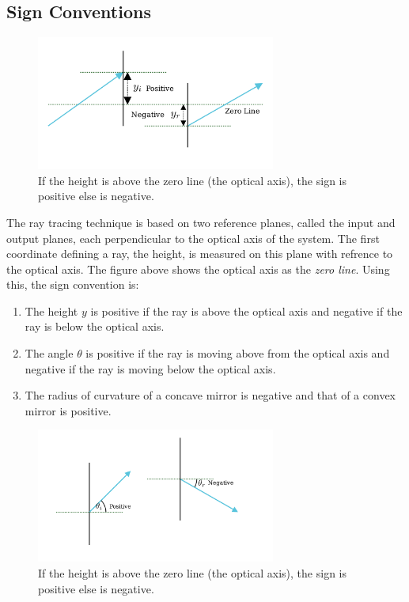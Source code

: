 \documentclass[12pt]{article}
\begin{document}
\subsection{Sign Conventions}
\begin{figure}[h]
    \centering
    \includegraphics[width=0.7\textwidth]{images/sc_y_2.png}
    \caption{If the height is above the zero line (the optical axis), the sign is positive else is negative.}
    \label{fig:sign-y}
\end{figure}
The ray tracing technique is based on two reference planes, called the input and output planes, each perpendicular to the optical axis of the system. The first coordinate defining a ray, the height, is measured on this plane with refrence to the optical axis. The figure above shows the optical axis as the \textit{zero line}. Using this, the sign convention is:
\begin{enumerate}
    \item The height \(y\) is positive if the ray is above the optical axis and negative if the ray is below the optical axis.
    \item The angle \(\theta\) is positive if the ray is moving above from the optical axis and negative if the ray is moving below the optical axis.
    \item The radius of curvature of a concave mirror is negative and that of a convex mirror is positive.
\end{enumerate}
\begin{figure}[h]
    \centering
    \includegraphics[width=0.7\textwidth]{images/sc_2.png}
    \caption{If the height is above the zero line (the optical axis), the sign is positive else is negative.}
    \label{fig:sign-theta}
\end{figure}
\end{document}
